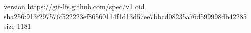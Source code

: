 version https://git-lfs.github.com/spec/v1
oid sha256:913f297576f522223ef86560114f1d13d57ee7bbcd08235a76d599998db42285
size 1181
